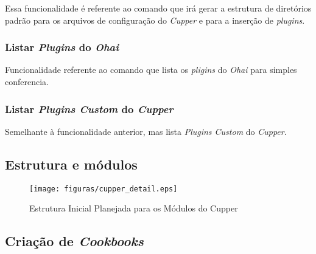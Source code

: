 Essa funcionalidade é referente ao comando que irá gerar a estrutura de
diretórios padrão para os arquivos de configuração do \textit{Cupper} e para
a inserção de \textit{plugins}.

\subsubsection{Listar \textit{Plugins} do \textit{Ohai}}

Funcionalidade referente ao comando que lista os \textit{pligins} do \textit{Ohai}
para simples conferencia.

\subsubsection{Listar \textit{Plugins Custom} do \textit{Cupper}}

Semelhante à funcionalidade anterior, mas lista \textit{Plugins Custom} do 
\textit{Cupper}.

\subsection{Estrutura e módulos}

\begin{figure}[H]
  \centering
  \texttt{[image: figuras/cupper\_detail.eps]}
  \caption{Estrutura Inicial Planejada para os Módulos do Cupper}
  \label{fig:cupper-detail}
\end{figure}



\subsection{Criação de \textit{Cookbooks}}
